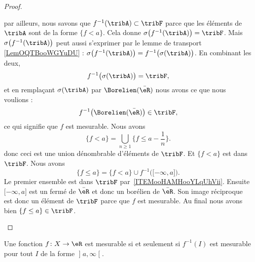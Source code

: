 \begin{proof}
\begin{subproof}
		par ailleurs, nous savons que \( f^{-1}(\tribA)\subset\tribF\) parce que les éléments de \( \tribA\) sont de la forme \( \{ f<a \}\). Cela donne \( \sigma\big( f^{-1}(\tribA) \big)=\tribF\). Mais \( \sigma\big( f^{-1}(\tribA) \big)\) peut aussi s'exprimer par le lemme de transport \ref{LemOQTBooWGYuDU} : \( \sigma\big( f^{-1}(\tribA) \big)=f^{-1}\big( \sigma(\tribA) \big)\). En combinant les deux,
		\begin{equation}
			f^{-1}\big( \sigma(\tribA) \big)=\tribF,
		\end{equation}
		et en remplaçant \( \sigma(\tribA)\) par \( \Borelien(\bar \eR)\) nous avons ce que nous voulions :
		\begin{equation}
			f^{-1}\big( \Borelien(\bar\eR) \big)\in\tribF,
		\end{equation}
		ce qui signifie que \( f\) est mesurable.
		\spitem[\ref{ITEMooHAMHooYLqUhViii}\( \Rightarrow\)\ref{ITEMooHAMHooYLqUhVii}]
		Nous avons
		\begin{equation}
			\{ f<a \}=\bigcup_{n\geq 1}\{ f\leq a-\frac{1}{ n } \}.
		\end{equation}
		donc ceci est une union dénombrable d'éléments de \( \tribF\). Et \( \{ f<a \}\) est dans \( \tribF\).
		\spitem[\ref{ITEMooHAMHooYLqUhVi}\( \Rightarrow\)\ref{ITEMooHAMHooYLqUhViii}]
		Nous avons
		\begin{equation}
			\{ f\leq a \}=\{ f<a \}\cup f^{-1}\big( \mathopen[ -\infty , a \mathclose] \big).
		\end{equation}
		Le premier ensemble est dans \( \tribF\) par~\ref{ITEMooHAMHooYLqUhVii}. Ensuite \( \mathopen[ -\infty , a \mathclose]\) est un fermé de \( \bar \eR\) et donc un borélien de \( \bar \eR\). Son image réciproque est donc un élément de \( \tribF\) parce que \( f\) est mesurable. Au final nous avons bien \( \{ f\leq a \}\in\tribF\).
	\end{subproof}
\end{proof}

\begin{lemma}   \label{LemFOlheqw}
	Une fonction \( f\colon X\to \eR\) est mesurable si et seulement si \( f^{-1}(I)\) est mesurable pour tout \( I\) de la forme \( \mathopen] a , \infty \mathclose[\).
\end{lemma}

